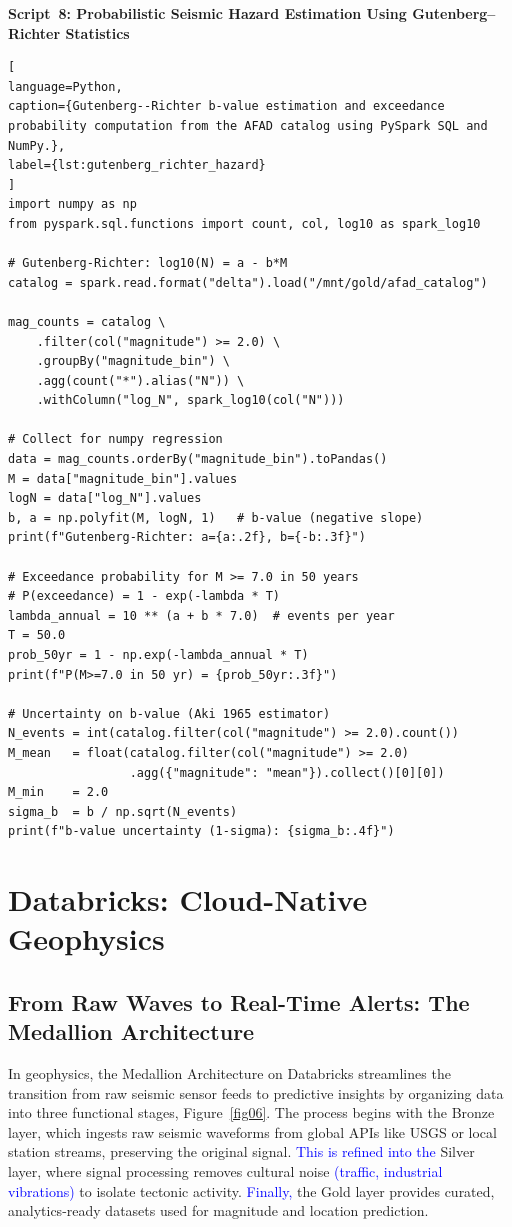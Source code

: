 \documentclass[data,article,submit,pdftex,moreauthors]{Definitions/mdpi}
\begin{document}
\textbf{Script~8: Probabilistic Seismic Hazard Estimation Using Gutenberg--Richter Statistics}

\begin{lstlisting}[
language=Python,
caption={Gutenberg--Richter b-value estimation and exceedance probability computation from the AFAD catalog using PySpark SQL and NumPy.},
label={lst:gutenberg_richter_hazard}
]
import numpy as np
from pyspark.sql.functions import count, col, log10 as spark_log10

# Gutenberg-Richter: log10(N) = a - b*M
catalog = spark.read.format("delta").load("/mnt/gold/afad_catalog")

mag_counts = catalog \
    .filter(col("magnitude") >= 2.0) \
    .groupBy("magnitude_bin") \
    .agg(count("*").alias("N")) \
    .withColumn("log_N", spark_log10(col("N")))

# Collect for numpy regression
data = mag_counts.orderBy("magnitude_bin").toPandas()
M = data["magnitude_bin"].values
logN = data["log_N"].values
b, a = np.polyfit(M, logN, 1)   # b-value (negative slope)
print(f"Gutenberg-Richter: a={a:.2f}, b={-b:.3f}")

# Exceedance probability for M >= 7.0 in 50 years
# P(exceedance) = 1 - exp(-lambda * T)
lambda_annual = 10 ** (a + b * 7.0)  # events per year
T = 50.0
prob_50yr = 1 - np.exp(-lambda_annual * T)
print(f"P(M>=7.0 in 50 yr) = {prob_50yr:.3f}")

# Uncertainty on b-value (Aki 1965 estimator)
N_events = int(catalog.filter(col("magnitude") >= 2.0).count())
M_mean   = float(catalog.filter(col("magnitude") >= 2.0)
                 .agg({"magnitude": "mean"}).collect()[0][0])
M_min    = 2.0
sigma_b  = b / np.sqrt(N_events)
print(f"b-value uncertainty (1-sigma): {sigma_b:.4f}")
\end{lstlisting}

\section{Databricks: Cloud-Native Geophysics}

\subsection{From Raw Waves to Real-Time Alerts: The Medallion Architecture}

In geophysics, the Medallion Architecture on Databricks streamlines the transition from raw seismic sensor feeds to predictive insights by organizing data into three functional stages, Figure~\ref{fig06}. The process begins with the Bronze layer, which ingests raw seismic waveforms from global APIs like USGS or local station streams, preserving the original signal. \textcolor{blue}{This is refined into the} Silver layer, where signal processing removes cultural noise \textcolor{blue}{(traffic, industrial vibrations)} to isolate tectonic activity. \textcolor{blue}{Finally,} the Gold layer provides curated, analytics-ready datasets used for magnitude and location prediction.
\end{document}
